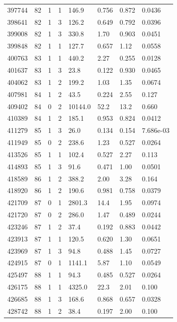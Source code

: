 \documentclass[preview]{standalone}
\begin{document}
{{{{{{{\begin{tabular}{L{1.2cm}C{1.2cm} C{0.3cm}C{0.5cm} C{1.4cm}C{1.4cm} C{1.4cm}C{1.4cm}}
  397744  &    82  & 1     &  1 &  146.9  & 0.756  & 0.872 &  0.0436   \\ 
  398641  &    82  & 1     &  3 &  126.2  & 0.649  & 0.792 &  0.0396   \\ 
  399008  &    82  & 1     &  3 &  330.8  & 1.70  & 0.903 &  0.0451   \\ 
  399848  &    82  & 1     &  1 &  127.7  & 0.657  & 1.12 &  0.0558   \\ 
  400763  &    83  & 1     &  1 &  440.2  & 2.27  & 0.255 &  0.0128   \\ 
  401637  &    83  & 1     &  3 &  23.8  & 0.122  & 0.930 &  0.0465   \\ 
  404062  &    83  & 1     &  2 &  199.2  & 1.03  & 1.35 &  0.0674   \\ 
  407981  &    84  & 1     &  2 &  43.5  & 0.224  & 2.55 &  0.127   \\ 
  409402  &    84  & 0     &  2 &  10144.0  & 52.2  & 13.2 &  0.660   \\ 
  410389  &    84  & 1     &  2 &  185.1  & 0.953  & 0.824 &  0.0412   \\ 
  411279  &    85  & 1     &  3 &  26.0  & 0.134  & 0.154 &  7.686e-03   \\ 
  411949  &    85  & 0     &  2 &  238.6  & 1.23  & 0.527 &  0.0264   \\ 
  413526  &    85  & 1     &  1 &  102.4  & 0.527  & 2.27 &  0.113   \\ 
  414893  &    85  & 1     &  3 &  91.6  & 0.471  & 1.00 &  0.0501   \\ 
  418589  &    86  & 1     &  2 &  388.2  & 2.00  & 3.28 &  0.164   \\ 
  418920  &    86  & 1     &  2 &  190.6  & 0.981  & 0.758 &  0.0379   \\ 
  421709  &    87  & 0     &  1 &  2801.3  & 14.4  & 1.95 &  0.0974   \\ 
  421720  &    87  & 0     &  2 &  286.0  & 1.47  & 0.489 &  0.0244   \\ 
  423246  &    87  & 1     &  2 &  37.4  & 0.192  & 0.883 &  0.0442   \\ 
  423913  &    87  & 1     &  1 &  120.5  & 0.620  & 1.30 &  0.0651   \\ 
  423969  &    87  & 1     &  3 &  94.8  & 0.488  & 1.45 &  0.0727   \\ 
  424915  &    87  & 0     &  1 &  1141.1  & 5.87  & 1.10 &  0.0549   \\ 
  425497  &    88  & 1     &  1 &  94.3  & 0.485  & 0.527 &  0.0264   \\ 
  426175  &    88  & 1     &  1 &  4325.0  & 22.3  & 2.01 &  0.100   \\ 
  426685  &    88  & 1     &  3 &  168.6  & 0.868  & 0.657 &  0.0328   \\ 
  428742  &    88  & 1     &  2 &  38.4  & 0.197  & 2.00 &  0.100   \\ 
\hline 
\end{tabular} 

}}}}}}}
\end{document}

